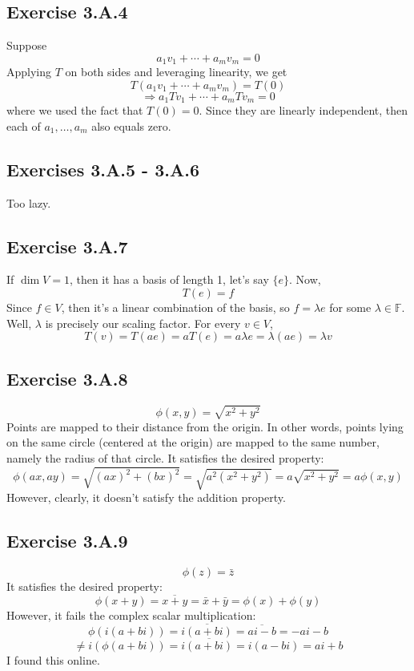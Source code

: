 \documentclass{book}
\begin{document}
\subsection*{Exercise 3.A.4}
Suppose
$$a_1 v_1 + \cdots + a_m v_m = 0$$
Applying $T$ on both sides and leveraging linearity, we get
$$T(a_1 v_1 + \cdots + a_m v_m) = T(0)$$
$$\Rightarrow a_1 Tv_1 + \cdots + a_m Tv_m = 0$$
where we used the fact that $T(0) = 0$. Since they are linearly independent, then each of $a_1, \ldots, a_m$ also equals zero.

\subsection*{Exercises 3.A.5 - 3.A.6}
Too lazy.

\subsection*{Exercise 3.A.7}
If $\dim V = 1$, then it has a basis of length 1, let's say $\{ e \}$. Now,
$$T(e) = f$$
Since $f \in V$, then it's a linear combination of the basis, so $f = \lambda e$ for some $\lambda \in \mathbb{F}$. Well, $\lambda$ is precisely our scaling factor. For every $v \in V$,
$$T(v) = T(ae) = aT(e) = a \lambda e = \lambda (ae) = \lambda v$$

\subsection*{Exercise 3.A.8}
$$\phi (x, y) = \sqrt{x^2 + y^2}$$
Points are mapped to their distance from the origin. In other words, points lying on the same circle (centered at the origin) are mapped to the same number, namely the radius of that circle. It satisfies the desired property:
$$\phi (ax, ay) = \sqrt{(ax)^2 + (bx)^2} = \sqrt{a^2(x^2 + y^2)} = a \sqrt{x^2 + y^2} = a \phi (x, y)$$
However, clearly, it doesn't satisfy the addition property.

\subsection*{Exercise 3.A.9}
$$\phi(z) = \bar{z}$$
It satisfies the desired property:
$$\phi(x + y) = \overline{x + y} = \bar{x} + \bar{y} = \phi(x) + \phi(y)$$
However, it fails the complex scalar multiplication:
$$\phi(i(a + bi)) = \overline{i(a + bi)} = \overline{ai - b} = -ai - b$$
$$\neq i(\phi(a + bi)) = i \overline{(a + bi)} = i(a - bi) = ai + b$$
I found this online.
\end{document}
